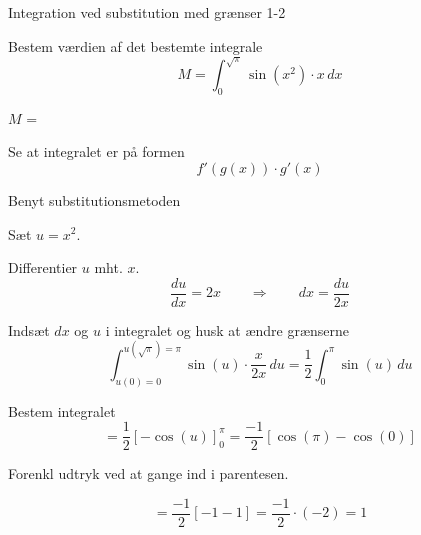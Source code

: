 \documentclass{article}
\begin{document}
\begin{exercise}{Integration ved substitution med grænser 1-2}
	
	
	Bestem værdien af det bestemte integrale
	\[
	M =	\int_{0}^{\sqrt{\pi}} \sin(x^2) \cdot x \, dx
	\]
	
	$M$ = 
	
	
	
	\hint
	
	Se at integralet er på formen
	\[
	f'(g(x)) \cdot g'(x)
	\]
	
	\hint
	
	Benyt substitutionsmetoden
	
	\hint
	
	Sæt $u=x^2$.
	
	
	\hint
	
	Differentier $u$ mht. $x$.
	\[
	\frac{du}{dx} = 2x \qquad	\Rightarrow \qquad dx = \frac{du}{2x}
	\]
	
	\hint
	
	Indsæt $dx$ og $u$ i integralet og husk at ændre grænserne
	\[
	\int_{u(0)=0}^{u(\sqrt{\pi})=\pi} \sin(u) \cdot \frac{x}{2x} \, du = \frac{1}{2} \int_0^\pi \sin(u) \, du
	\]
	
	\hint
	
	Bestem integralet
	\[
	= \frac{1}{2} \left[-\cos(u) \right]_0^\pi = \frac{-1}{2} \left[\cos(\pi) -\cos(0) \right]
	\]
	
	\hint
	Forenkl udtryk ved at gange ind i parentesen.
	
	\hint
	
	\[
	= \frac{-1}{2} \left[-1 - 1 \right] = \frac{-1}{2} \cdot (-2) = 1
	\]
	
	
\end{exercise}

\newpage
\end{document}
